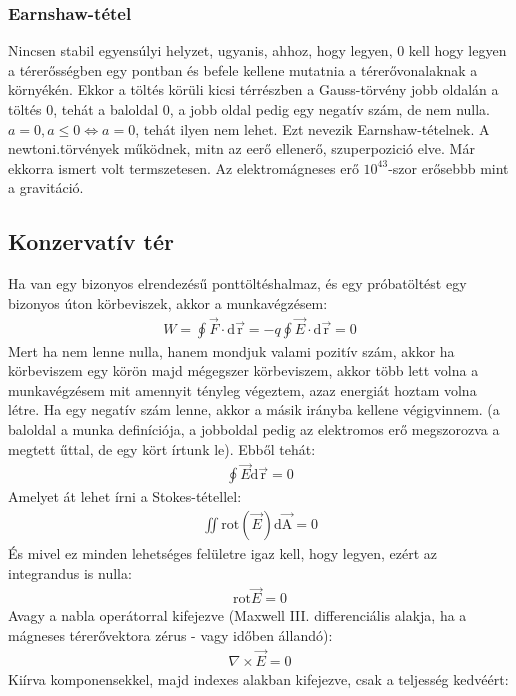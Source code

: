 \documentclass{article}
\begin{document}
\subsubsection{Earnshaw-tétel}
Nincsen stabil egyensúlyi helyzet, ugyanis, ahhoz, hogy legyen, 0  kell hogy legyen a térerősségben egy pontban és befele kellene mutatnia a térerővonalaknak a környékén. Ekkor a töltés körüli kicsi térrészben a Gauss-törvény jobb oldalán a töltés 0, tehát a baloldal 0, a jobb oldal pedig egy negatív szám, de nem nulla. $a=0, a \leq 0 \Leftrightarrow a=0$, tehát ilyen nem lehet. Ezt nevezik Earnshaw-tételnek.
A newtoni.törvények működnek, mitn az eerő ellenerő, szuperpozició elve. Már ekkorra ismert volt termszetesen. Az elektromágneses erő $10^{43}$-szor erősebbb mint a gravitáció.
\subsection{Konzervatív tér}
Ha van egy bizonyos elrendezésű ponttöltéshalmaz, és egy próbatöltést egy bizonyos úton körbeviszek, akkor a munkavégzésem:
\begin{gather*}
W = \oint \vec{F} \cdot \mathrm{d\vec{r}} = -q \oint \vec{E} \cdot \mathrm{d\vec{r}} = 0
\end{gather*}
Mert ha nem lenne nulla, hanem mondjuk valami pozitív szám, akkor ha körbeviszem egy körön majd mégegszer körbeviszem, akkor több lett volna a munkavégzésem mit amennyit tényleg végeztem, azaz energiát hoztam volna létre. Ha egy negatív szám lenne, akkor a másik irányba kellene végigvinnem. (a baloldal a munka definíciója, a jobboldal pedig az elektromos erő megszorozva a megtett űttal, de egy kört írtunk le). Ebből tehát:
\begin{gather*}
\oint \vec{E} \mathrm{d\vec{r}}= 0
\end{gather*}
Amelyet át lehet írni a Stokes-tétellel:
\begin{gather*}
\iint \mathrm{rot} (\vec{E}) \mathrm{d\vec{A}} = 0
\end{gather*}
És mivel ez minden lehetséges felületre igaz kell, hogy legyen, ezért az integrandus is nulla:
\begin{gather*}
\mathrm{rot} \vec{E} = 0
\end{gather*}
Avagy a nabla operátorral kifejezve (Maxwell III. differenciális alakja, ha a mágneses térerővektora zérus  - vagy időben állandó):
\begin{gather*}
\boxed{\nabla \times \vec{E} = 0}
\end{gather*}
Kiírva komponensekkel, majd indexes alakban kifejezve, csak a teljesség kedvéért:
\end{document}
